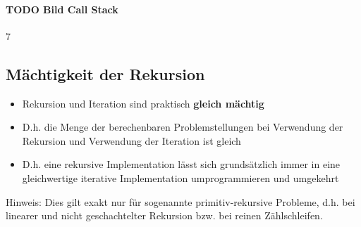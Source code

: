 \paragraph{TODO Bild Call Stack}7

\subsection{Mächtigkeit der Rekursion}
\begin{itemize}[noitemsep,topsep=0pt,leftmargin=*]
    \item Rekursion und Iteration sind praktisch \textbf{gleich mächtig}
    \item D.h. die Menge der berechenbaren Problemstellungen bei Verwendung der Rekursion und Verwendung der Iteration ist gleich
    \item D.h. eine rekursive Implementation lässt sich grundsätzlich immer in eine gleichwertige iterative Implementation umprogrammieren und umgekehrt
\end{itemize}
Hinweis: Dies gilt exakt nur für sogenannte primitiv-rekursive Probleme, d.h. bei linearer und nicht geschachtelter Rekursion bzw. bei reinen Zählschleifen.
